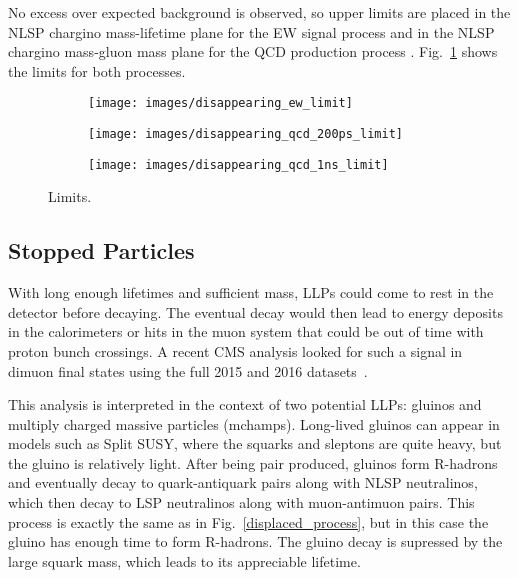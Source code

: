 \documentclass[12pt]{article}
\begin{document}
        No excess over expected background is observed, so upper limits are placed in the NLSP chargino mass-lifetime plane for the EW signal process and in the NLSP chargino mass-gluon mass plane for the QCD production process . Fig.~\ref{disappearing_limits} shows the limits for both processes.

        \noindent \begin{figure}[htbp] \begin{center}
        \begin{subfigure}[htbp]{0.3\textwidth} \begin{center}
        \texttt{[image: images/disappearing\_ew\_limit]}
        \end{center} \end{subfigure}
        \begin{subfigure}[htbp]{0.3\textwidth} \begin{center}
        \texttt{[image: images/disappearing\_qcd\_200ps\_limit]}
        \end{center} \end{subfigure}
        \begin{subfigure}[htbp]{0.3\textwidth} \begin{center}
        \texttt{[image: images/disappearing\_qcd\_1ns\_limit]}
        \end{center} \end{subfigure}
            \caption{Limits.~\cite{atlas_disappearing}}
        \label{disappearing_limits}
        \end{center} \end{figure}

    \subsection{Stopped Particles}
        With long enough lifetimes and sufficient mass, LLPs could come to rest in the detector before decaying. The eventual decay would then lead to energy deposits in the calorimeters or hits in the muon system that could be out of time with proton bunch crossings. A recent CMS analysis looked for such a signal in dimuon final states using the full 2015 and 2016 datasets~\cite{cms_stopped}. 

        This analysis is interpreted in the context of two potential LLPs: gluinos and multiply charged massive particles (mchamps). Long-lived gluinos can appear in models such as Split SUSY, where the squarks and sleptons are quite heavy, but the gluino is relatively light. After being pair produced, gluinos form R-hadrons and eventually decay to quark-antiquark pairs along with NLSP neutralinos, which then decay to LSP neutralinos along with muon-antimuon pairs. This process is exactly the same as in Fig.~\ref{displaced_process}, but in this case the gluino has enough time to form R-hadrons. The gluino decay is supressed by the large squark mass, which leads to its appreciable lifetime.
\end{document}
